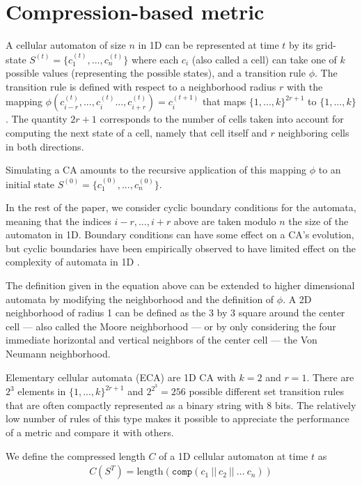 \section{Compression-based metric}\label{sec:compr-based-metr}

A cellular automaton of size $n$ in 1D can be represented at time $t$ by its
grid-state $S^{(t)} = \{c_1^{(t)}, ..., c_n^{(t)}\}$ where each $c_i$ (also
called a cell) can take one of $k$ possible values (representing the possible
states), and a transition rule $\phi$. The transition rule is defined with
respect to a neighborhood radius $r$ with the mapping $\phi(c^{(t)}_{i-r}, ...,
c^{(t)}_i ..., c^{(t)}_{i+r} ) = c^{(t+1)}_i$ that maps $\{1, ..., k\}^{2r+1}$
to $\{1, ..., k\}$. The quantity $2r + 1$ corresponds to the number of
cells taken into account for computing the next state of a cell, namely that
cell itself and $r$ neighboring cells in both directions.

Simulating a CA amounts to the recursive application of this mapping $\phi$ to
an initial state $S^{(0)} = \{c_1^{(0)}, ..., c_n^{(0)}\}$.

In the rest of the paper, we consider cyclic boundary conditions for the
automata, meaning that the indices $i-r, ..., i+r$ above are taken modulo $n$
the size of the automaton in 1D.  Boundary conditions can have some
effect on a CA's evolution, but cyclic boundaries have been empirically
observed to have limited effect on the complexity of automata in 1D
\parencite{luvalle_effects_2019}.

The definition given in the equation above can be extended to higher dimensional
automata by modifying the neighborhood and the definition of $\phi$. A 2D
neighborhood of radius 1 can be defined as the 3 by 3 square around the center
cell --- also called the Moore neighborhood --- or by only considering the four
immediate horizontal and vertical neighbors of the center cell --- the Von
Neumann neighborhood.

Elementary cellular automata (ECA) are 1D CA with $k = 2$ and $r = 1$. There are
$2^3$ elements in $\{1, ..., k\}^{2r+1}$ and $2^{2^3} = 256$ possible different
set transition rules that are often compactly represented as a binary string
with 8 bits. The relatively low number of rules of this type makes it possible
to appreciate the performance of a metric and compare it with others.

We define the compressed length $C$ of a 1D cellular automaton at time $t$ as
\begin{align}
  \textstyle
  C(S^{T}) = \text{length}\left(\texttt{comp}(c_1\ ||\ c_2\ ||\ ...\ c_n)\right)
\end{align}

